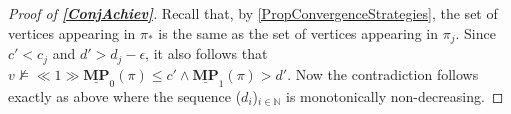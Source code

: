 \begin{proof}[Proof of \textbf{\cref{ConjAchiev}}]
Recall that, by \cref{PropConvergenceStrategies}, the set of vertices appearing in $\pi_*$ is the same as the set of vertices appearing in $\pi_j$.
Since $c' < c_j$ and $d' > d_j-\epsilon$, it also follows that $v \not \models \ll 1 \gg \underline{\mathbf{MP}}_0(\pi) \leqslant c' \land \underline{\mathbf{MP}}_1(\pi) > d'$.
Now the contradiction follows exactly as above where the sequence ($d_i$)$_{i \in \mathbb{N}}$ is monotonically non-decreasing.
\end{proof}
